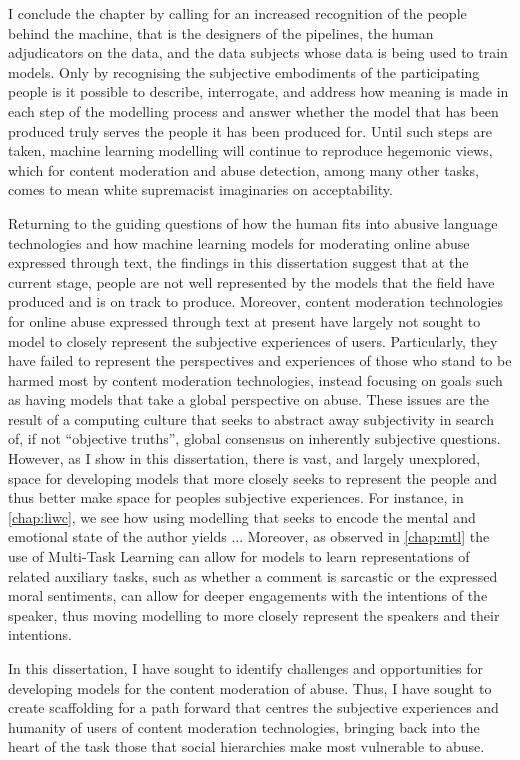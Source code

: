 I conclude the chapter by calling for an increased recognition of the people behind the machine, that is the designers of the pipelines, the human adjudicators on the data, and the data subjects whose data is being used to train models.
Only by recognising the subjective embodiments of the participating people is it possible to describe, interrogate, and address how meaning is made in each step of the modelling process and answer whether the model that has been produced truly serves the people it has been produced for.
Until such steps are taken, machine learning modelling will continue to reproduce hegemonic views, which for content moderation and abuse detection, among many other tasks, comes to mean white supremacist imaginaries on acceptability.


\vspace{5mm}
Returning to the guiding questions of how the human fits into abusive language technologies and how machine learning models for moderating online abuse expressed through text, the findings in this dissertation suggest that at the current stage, people are not well represented by the models that the field have produced and is on track to produce.
Moreover, content moderation technologies for online abuse expressed through text at present have largely not sought to model to closely represent the subjective experiences of users.
Particularly, they have failed to represent the perspectives and experiences of those who stand to be harmed most by content moderation technologies, instead focusing on goals such as having models that take a global perspective on abuse.
These issues are the result of a computing culture that seeks to abstract away subjectivity in search of, if not ``objective truths'', global consensus on inherently subjective questions.
However, as I show in this dissertation, there is vast, and largely unexplored, space for developing models that more closely seeks to represent the people and thus better make space for peoples subjective experiences.
For instance, in \cref{chap:liwc}, we see how using modelling that seeks to encode the mental and emotional state of the author yields ... %
Moreover, as observed in \cref{chap:mtl} the use of Multi-Task Learning can allow for models to learn representations of related auxiliary tasks, such as whether a comment is sarcastic or the expressed moral sentiments, can allow for deeper engagements with the intentions of the speaker, thus moving modelling to more closely represent the speakers and their intentions.

In this dissertation, I have sought to identify challenges and opportunities for developing models for the content moderation of abuse.
Thus, I have sought to create scaffolding for a path forward that centres the subjective experiences and humanity of users of content moderation technologies, bringing back into the heart of the task those that social hierarchies make most vulnerable to abuse.
